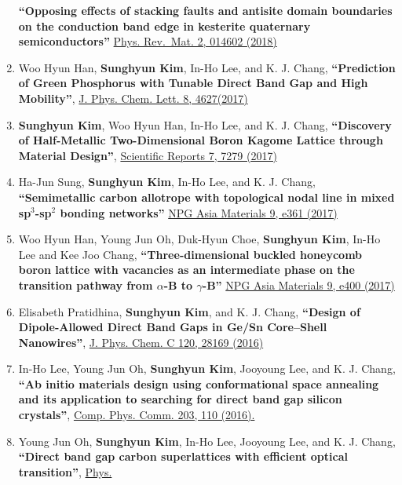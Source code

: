\begin{enumerate}
  \textbf{``Opposing effects of stacking faults and antisite domain
  boundaries on the conduction band edge in kesterite quaternary
  semiconductors''}
  \href{https://journals.aps.org/prmaterials/abstract/10.1103/PhysRevMaterials.2.014602}{Phys.
  Rev.~Mat. 2, 014602 (2018)}
\item
  Woo Hyun Han, \textbf{Sunghyun Kim}, In-Ho Lee, and K. J. Chang,
  \textbf{``Prediction of Green Phosphorus with Tunable Direct Band Gap
  and High Mobility''},
  \href{https://pubs.acs.org/doi/10.1021/acs.jpclett.7b02153}{J. Phys.
  Chem. Lett. 8, 4627(2017)}
\item
  \textbf{Sunghyun Kim}, Woo Hyun Han, In-Ho Lee, and K. J. Chang,
  \textbf{``Discovery of Half-Metallic Two-Dimensional Boron Kagome
  Lattice through Material Design''},
  \href{https://www.nature.com/articles/s41598-017-07518-9}{Scientific
  Reports 7, 7279 (2017)}
\item
  Ha-Jun Sung, \textbf{Sunghyun Kim}, In-Ho Lee, and K. J. Chang,
  \textbf{``Semimetallic carbon allotrope with topological nodal line in
  mixed sp\(^3\)-sp\(^2\) bonding networks''}
  \href{http://www.nature.com/am/journal/v9/n3/full/am201726a.html}{NPG
  Asia Materials 9, e361 (2017)}
\item
  Woo Hyun Han, Young Jun Oh, Duk-Hyun Choe, \textbf{Sunghyun Kim},
  In-Ho Lee and Kee Joo Chang, \textbf{``Three-dimensional buckled
  honeycomb boron lattice with vacancies as an intermediate phase on the
  transition pathway from \(\alpha\)-B to \(\gamma\)-B''}
  \href{http://www.nature.com/am/journal/v9/n7/full/am201798a.html}{NPG
  Asia Materials 9, e400 (2017)}
\item
  Elisabeth Pratidhina, \textbf{Sunghyun Kim}, and K. J. Chang,
  \textbf{``Design of Dipole-Allowed Direct Band Gaps in Ge/Sn
  Core--Shell Nanowires''},
  \href{http://pubs.acs.org/doi/abs/10.1021/acs.jpcc.6b08779}{J. Phys.
  Chem. C 120, 28169 (2016)}
\item
  In-Ho Lee, Young Jun Oh, \textbf{Sunghyun Kim}, Jooyoung Lee, and K.
  J. Chang, \textbf{``Ab initio materials design using conformational
  space annealing and its application to searching for direct band gap
  silicon crystals''},
  \href{http://dx.doi.org/10.1016/j.cpc.2016.02.011}{Comp. Phys. Comm.
  203, 110 (2016).}
\item
  Young Jun Oh, \textbf{Sunghyun Kim}, In-Ho Lee, Jooyoung Lee, and K.
  J. Chang, \textbf{``Direct band gap carbon superlattices with
  efficient optical transition''},
  \href{http://journals.aps.org/prb/abstract/10.1103/PhysRevB.93.085201}{Phys.
}
\end{enumerate}
